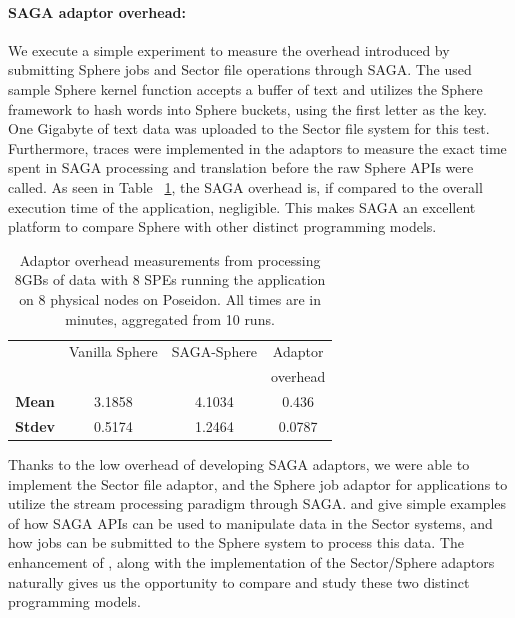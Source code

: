 \documentclass[3p,twocolumn]{elsarticle}
\begin{document}
\paragraph{SAGA adaptor overhead:} \label{ssec:overhead}

We execute a simple experiment to measure the overhead introduced by
submitting Sphere jobs and Sector file operations through SAGA.  The
used sample Sphere kernel function accepts a buffer of text and
utilizes the Sphere framework to hash words into Sphere buckets, using
the first letter as the key. One Gigabyte of text data was uploaded to
the Sector file system for this test.  Furthermore, traces were
implemented in the adaptors to measure the exact time spent in SAGA
processing and translation before the raw Sphere APIs were called.  As
seen in Table ~\ref{tab:sphere_overhead}, the SAGA overhead is, if compared
to the overall execution time of the application, negligible.
This makes SAGA an excellent platform to compare Sphere with other distinct
programming models.

\begin{table}[h!]
  \footnotesize
  \begin{tabular}{cccc}
    \hline
    & Vanilla Sphere &  SAGA-Sphere & Adaptor \\
    &                &              & overhead \\
    \hline
    { {\bf Mean}} & 3.1858 & 4.1034 & 0.436 \\
    \hline 
    { {\bf Stdev}} & 0.5174 & 1.2464 & 0.0787 \\
    \hline \hline
  \end{tabular}
  \caption{Adaptor overhead measurements from processing 8GBs of data with 8
  SPEs running the \wc application on 8 physical nodes on Poseidon.
  All times are in minutes, aggregated from 10 runs.\uppp
  \label{tab:sphere_overhead}}
\end{table}


Thanks to the low overhead of developing SAGA adaptors, we were able
to implement the Sector file adaptor, and the Sphere job adaptor for
applications to utilize the stream processing paradigm through SAGA.
 and  give simple examples of how SAGA APIs
can be used to manipulate data in the Sector systems, and how jobs can
be submitted to the Sphere system to process this data.  The
enhancement of \sagamapreduce, along with the implementation of the
Sector/Sphere adaptors naturally gives us the opportunity to compare
and study these two distinct programming models.
\end{document}
